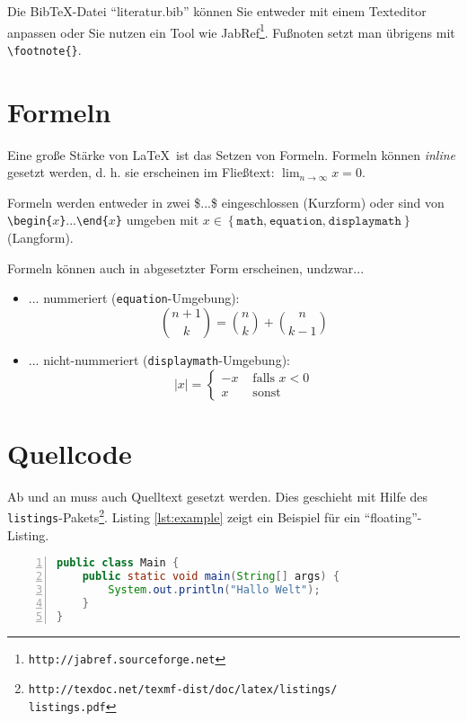 \documentclass[ngerman]{ewks-latex}
\begin{document}
Die Bib\TeX-Datei "`literatur.bib"' können Sie entweder mit einem Texteditor anpassen oder Sie nutzen ein Tool wie JabRef\footnote{\texttt{http://jabref.sourceforge.net}}. Fußnoten setzt man übrigens mit \texttt{\textbackslash footnote\{\}}.

\section{Formeln}
Eine große Stärke von \LaTeX \ ist das Setzen von Formeln. Formeln können \textit{inline} gesetzt werden, d. h. sie erscheinen im Fließtext: $\lim_{n\rightarrow \infty}x=0$.

Formeln werden entweder in zwei \$...\$ eingeschlossen (Kurzform) oder sind von \texttt{\textbackslash begin\{$x$\}}...\texttt{\textbackslash end\{$x$\}} umgeben mit $x\in\left\{ \mathtt{math\textrm{,}\:\mathtt{equation\textrm{,}\: displaymath}}\right\}$ (Langform).

Formeln können auch in abgesetzter Form erscheinen, undzwar...
\begin{itemize}
\item ... nummeriert (\texttt{equation}-Umgebung):
\begin{equation}
{n+1\choose k} = {n\choose k} + {n \choose k-1}
\end{equation}

\item ... nicht-nummeriert (\texttt{displaymath}-Umgebung):
\begin{displaymath}
|x| = \left\{ \begin{array}{rl}
 -x &\mbox{ falls $x<0$} \\
  x &\mbox{ sonst}
       \end{array} \right.
\end{displaymath}
\end{itemize} 


\section{Quellcode}
Ab und an muss auch Quelltext gesetzt werden. Dies geschieht mit Hilfe des \texttt{listings}-Pakets\footnote{\texttt{http://texdoc.net/texmf-dist/doc/latex/listings/\\listings.pdf}}. Listing \ref{lst:example} zeigt ein Beispiel für ein "`floating"'-Listing.

\begin{lstlisting}[float, caption=Beispiel eines Java-Listings, label=lst:example, language=java, basicstyle=\small, tabsize=4, showstringspaces=false, numbers=left, frame=single, keywordstyle=\bfseries]
public class Main {
	public static void main(String[] args) {
		System.out.println("Hallo Welt");
	}
}
\end{lstlisting}
\end{document}
